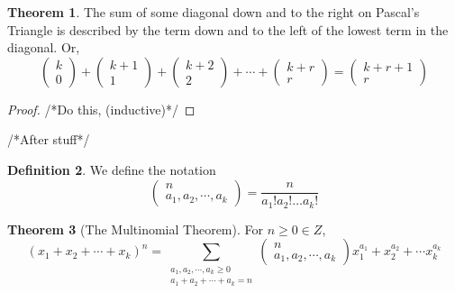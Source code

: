 \documentclass[11pt]{article}
\theoremstyle{definition}
\newtheorem{theorem}{Theorem}[section]
\newtheorem{definition}[theorem]{Definition}
\begin{document}
\begin{theorem}
    The sum of some diagonal down and to the right on Pascal's Triangle is described by the term down and to the left of the lowest term in the diagonal. Or, 
    \begin{equation*}
        \begin{pmatrix} k    \\ 0 \end{pmatrix} +
        \begin{pmatrix} k+1  \\ 1 \end{pmatrix} +
        \begin{pmatrix} k+2  \\ 2 \end{pmatrix} +
        \cdots +
        \begin{pmatrix} k+r  \\ r \end{pmatrix} =
        \begin{pmatrix} k+r+1\\ r\end{pmatrix}
    \end{equation*}
\end{theorem}
\begin{proof}
    /*Do this, (inductive)*/
\end{proof}
/*After stuff*/
\begin{definition}
    We define the notation $$\begin{pmatrix} n \\ a_1,a_2,\cdots,a_k \end{pmatrix}=\frac{n}{a_1! a_2! \ldots a_k!}$$
\end{definition}
\begin{theorem} [The Multinomial Theorem] For $n \geq 0 \in Z$,
    \begin{equation*}
        {(x_1+x_2+\cdots+x_k)}^{n}=\sum_{\substack{a_1,a_2,\cdots,a_k \geq 0 \\ a_1+a_2+\cdots+a_k=n}}
        \begin{pmatrix} n \\ a_1,a_2,\cdots,a_k \end{pmatrix}
        x_1^{a_1} + x_2^{a_2} + \cdots x_k^{a_k}
    \end{equation*}
\end{theorem}
\end{document}
